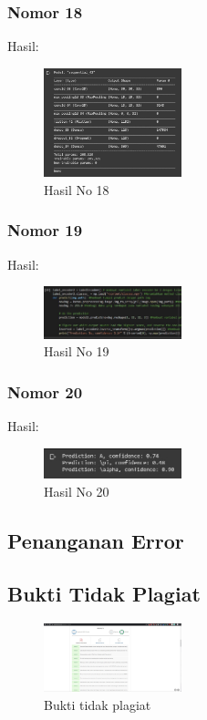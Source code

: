 \subsubsection{Nomor 18}
\hfill\break

Hasil:
\begin{figure}[H]
\centering
	\includegraphics[width=4cm]{figures/1174057/chapter7/no18.jpg}
	\caption{Hasil No 18}
\end{figure}

\subsubsection{Nomor 19}
\hfill\break

Hasil:
\begin{figure}[H]
\centering
	\includegraphics[width=4cm]{figures/1174057/chapter7/no19.jpg}
	\caption{Hasil No 19}
\end{figure}

\subsubsection{Nomor 20}
\hfill\break

Hasil:
\begin{figure}[H]
\centering
	\includegraphics[width=4cm]{figures/1174057/chapter7/no20.jpg}
	\caption{Hasil No 20}
\end{figure}

\subsection{Penanganan Error}

\subsection{Bukti Tidak Plagiat}
\begin{figure}[H]
	\includegraphics[width=4cm]{figures/1174057/chapter7/plagiat.jpg}
	\centering
	\caption{Bukti tidak plagiat}
\end{figure}
